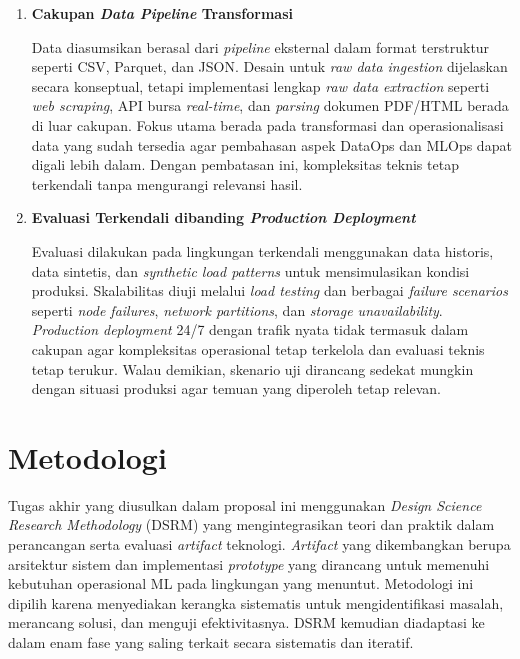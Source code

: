 \begin{enumerate}
    \vspace{0.5em}
    
    \item \textbf{Cakupan \textit{Data Pipeline} Transformasi}
    
    Data diasumsikan berasal dari \textit{pipeline} eksternal dalam format terstruktur seperti CSV, Parquet, dan JSON. Desain untuk \textit{raw data ingestion} dijelaskan secara konseptual, tetapi implementasi lengkap \textit{raw data extraction} seperti \textit{web scraping}, API bursa \textit{real-time}, dan \textit{parsing} dokumen PDF/HTML berada di luar cakupan. Fokus utama berada pada transformasi dan operasionalisasi data yang sudah tersedia agar pembahasan aspek DataOps dan MLOps dapat digali lebih dalam. Dengan pembatasan ini, kompleksitas teknis tetap terkendali tanpa mengurangi relevansi hasil.
    
    \vspace{0.5em}

    \item \textbf{Evaluasi Terkendali dibanding \textit{Production Deployment}}
    
    Evaluasi dilakukan pada lingkungan terkendali menggunakan data historis, data sintetis, dan \textit{synthetic load patterns} untuk mensimulasikan kondisi produksi. Skalabilitas diuji melalui \textit{load testing} dan berbagai \textit{failure scenarios} seperti \textit{node failures}, \textit{network partitions}, dan \textit{storage unavailability}. \textit{Production deployment} 24/7 dengan trafik nyata tidak termasuk dalam cakupan agar kompleksitas operasional tetap terkelola dan evaluasi teknis tetap terukur. Walau demikian, skenario uji dirancang sedekat mungkin dengan situasi produksi agar temuan yang diperoleh tetap relevan.
\end{enumerate}

\section{Metodologi}

Tugas akhir yang diusulkan dalam proposal ini menggunakan \textit{Design Science Research Methodology} (DSRM) yang mengintegrasikan teori dan praktik dalam perancangan serta evaluasi \textit{artifact} teknologi. \textit{Artifact} yang dikembangkan berupa arsitektur sistem dan implementasi \textit{prototype} yang dirancang untuk memenuhi kebutuhan operasional ML pada lingkungan yang menuntut. Metodologi ini dipilih karena menyediakan kerangka sistematis untuk mengidentifikasi masalah, merancang solusi, dan menguji efektivitasnya. DSRM kemudian diadaptasi ke dalam enam fase yang saling terkait secara sistematis dan iteratif.

